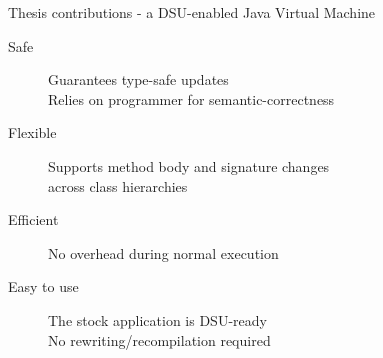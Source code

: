 

\begin{frame}{Thesis contributions}%
\DSU{} - a DSU-enabled Java Virtual Machine \\
\begin{description}
\item[Safe] Guarantees type-safe updates\\
              Relies on programmer for semantic-correctness
\item[Flexible] Supports method body and signature changes\\
                   across class hierarchies
\item[Efficient] No overhead during normal execution
\item[Easy to use] The stock application is DSU-ready\\
                   No rewriting/recompilation required
\end{description}
\end{frame}

